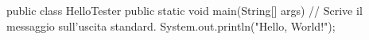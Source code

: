\begin{unipdcode}[language=Java]
public class HelloTester {
    public static void main(String[] args) {
        // Scrive il messaggio sull'uscita standard.
        System.out.println("Hello, World!");
    }
}
\end{unipdcode}
